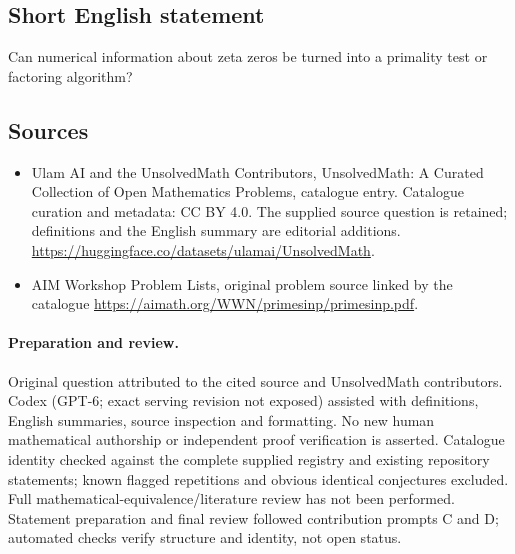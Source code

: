 \documentclass[11pt]{article}
\begin{document}
\subsection{Short English statement}
Can numerical information about zeta zeros be turned into a primality test or factoring algorithm?
\subsection{Sources}
\begin{itemize}
\item[\hypertarget{source:statement:1}{S1}] Ulam AI and the UnsolvedMath Contributors, UnsolvedMath: A Curated Collection of Open Mathematics Problems, catalogue entry. Catalogue curation and metadata: CC BY 4.0. The supplied source question is retained; definitions and the English summary are editorial additions.
\url{https://huggingface.co/datasets/ulamai/UnsolvedMath}.
\item[\hypertarget{source:statement:2}{S2}] AIM Workshop Problem Lists, original problem source linked by the catalogue
\url{https://aimath.org/WWN/primesinp/primesinp.pdf}.
\end{itemize}
\paragraph{Preparation and review.}
Original question attributed to the cited source and UnsolvedMath contributors. Codex (GPT-6; exact serving revision not exposed) assisted with definitions, English summaries, source inspection and formatting. No new human mathematical authorship or independent proof verification is asserted. Catalogue identity checked against the complete supplied registry and existing repository statements; known flagged repetitions and obvious identical conjectures excluded. Full mathematical-equivalence/literature review has not been performed. Statement preparation and final review followed contribution prompts C and D; automated checks verify structure and identity, not open status.
\label{end:statement}
\end{document}
